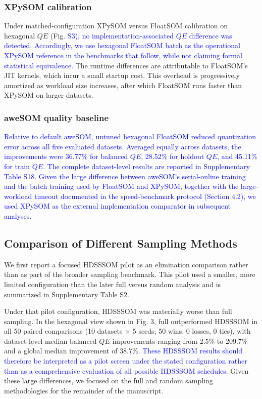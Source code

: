 \documentclass[10pt]{article} %
\newcommand{\TrackedChange}[1]{\textcolor{blue}{#1}}
\begin{document}
{\color{blue}\subsubsection{XPySOM calibration}}

Under matched-configuration XPySOM versus FloatSOM calibration on hexagonal $QE$ (Fig. \TrackedChange{S3), no implementation-associated $QE$ difference was detected.} \TrackedChange{Accordingly, we use hexagonal FloatSOM batch as the operational XPySOM reference in the benchmarks that follow, while not claiming formal statistical equivalence.} The runtime differences are attributable to FloatSOM's JIT kernels, which incur a small startup cost. This overhead is progressively amortized as workload size increases, after which FloatSOM runs faster than XPySOM on larger datasets.

{\color{blue}\subsubsection{aweSOM quality baseline}}

\TrackedChange{Relative to default aweSOM, untuned hexagonal FloatSOM reduced quantization error across all five evaluated datasets.} \TrackedChange{Averaged equally across datasets, the improvements were 36.77\% for balanced $QE$, 28.52\% for holdout $QE$, and 45.11\% for train $QE$.} \TrackedChange{The complete dataset-level results are reported in Supplementary Table S18.} \TrackedChange{Given the large difference between aweSOM's serial-online training and the batch training used by FloatSOM and XPySOM, together with the large-workload timeout documented in the speed-benchmark protocol (Section 4.2), we used XPySOM as the external implementation comparator in subsequent analyses.}

\subsection{Comparison of Different Sampling Methods}

We first report a focused HDSSSOM pilot as an elimination comparison rather than as part of the broader sampling benchmark. This pilot used a smaller, more limited configuration than the later full versus random analysis and is summarized in Supplementary Table S2.

Under that pilot configuration, HDSSSOM was materially worse than full sampling. In the hexagonal view shown in Fig. 3, full outperformed HDSSSOM in all 50 paired comparisons (10 datasets $\times$ 5 seeds; 50 wins, 0 losses, 0 ties), with dataset-level median balanced-$QE$ improvements ranging from 2.5\% to 209.7\% and a global median improvement of 38.7\%. \TrackedChange{These HDSSSOM results should therefore be interpreted as a pilot screen under the stated configuration rather than as a comprehensive evaluation of all possible HDSSSOM schedules.} Given these large differences, we focused on the full and random sampling methodologies for the remainder of the manuscript.
\end{document}
